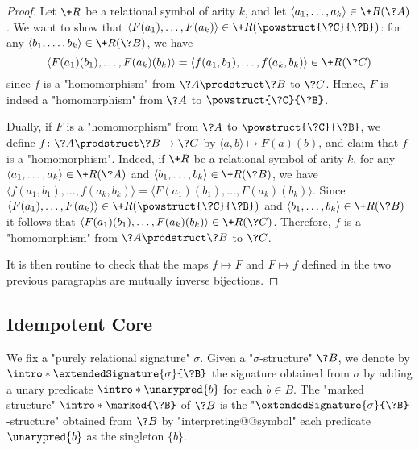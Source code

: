   \begin{proof}
	Let $\+R$ be a relational symbol of arity $k$, and let
	$\langle a_1,\hdots,a_k \rangle \in \+R(\?A)$.
	We want to show that $\langle F(a_1),\hdots,F(a_k) \rangle \in \+R(\powstruct{\?C}{\?B})$:
	for any $\langle b_1,\hdots,b_k \rangle \in \+R(\?B)$, we have
	\[\langle F(a_1)(b_1), \hdots, F(a_k)(b_k)\rangle = \langle f(a_1,b_1),\hdots,f(a_k,b_k) \rangle \in \+R(\?C)\] since $f$ is a "homomorphism" from $\?A\prodstruct \?B$ to $\?C$.
	Hence, $F$ is indeed a "homomorphism" from $\?A$ to $\powstruct{\?C}{\?B}$.
  
	Dually, if $F$ is a "homomorphism" from $\?A$ to $\powstruct{\?C}{\?B}$,
	we define $f\colon \?A\prodstruct \?B \to \?C$ by $\langle a,b \rangle \mapsto F(a)(b)$,
	and claim that $f$ is a "homomorphism". Indeed, if $\+R$ be a relational symbol of arity $k$,
	for any $\langle a_1, \hdots, a_k \rangle \in \+R(\?A)$
	and $\langle b_1, \hdots, b_k \rangle \in \+R(\?B)$,
	we have $\langle f(a_1,b_1), \hdots, f(a_k,b_k) \rangle
	= \langle F(a_1)(b_1), \hdots, F(a_k)(b_k) \rangle$.
	Since $\langle F(a_1), \hdots, F(a_k) \rangle \in \+R(\powstruct{\?C}{\?B})$
	and $\langle b_1, \hdots,b_k \rangle \in \+R(\?B)$ 
	it follows that $\langle F(a_1)(b_1), \hdots, F(a_k)(b_k) \rangle \in \+R(\?C)$.
	Therefore, $f$ is a "homomorphism" from $\?A \prodstruct \?B$ to $\?C$.
  
	It is then routine to check that the maps $f \mapsto F$ and $F \mapsto f$ defined
	in the two previous paragraphs are mutually inverse bijections.
  \end{proof}

  \subsection{Idempotent Core}

  We fix a "purely relational signature" $\sigma$.
  Given a "$\sigma$-structure" $\?B$,
  we denote by \AP$\intro*\extendedSignature{\sigma}{\?B}$
  the signature obtained from $\sigma$ by adding
  a unary predicate \AP$\intro*\unarypred{b}$ for each $b\in B$.
  The "marked structure" \AP$\intro*\marked{\?B}$ of $\?B$ is the
  "$\extendedSignature{\sigma}{\?B}$-structure"
  obtained from $\?B$ by "interpreting@@symbol" each predicate $\unarypred{b}$ as the
  singleton $\{b\}$.
  
